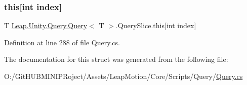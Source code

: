 \subsubsection{\texorpdfstring{this[int index]}{this[int index]}}
{\footnotesize\ttfamily T \mbox{\hyperlink{struct_leap_1_1_unity_1_1_query_1_1_query}{Leap.\+Unity.\+Query.\+Query}}$<$ T $>$.Query\+Slice.\+this\mbox{[}int index\mbox{]}\hspace{0.3cm}{\ttfamily [get]}}



Definition at line 288 of file Query.\+cs.



The documentation for this struct was generated from the following file\+:\begin{DoxyCompactItemize}
\item 
O\+:/\+Git\+H\+U\+B\+M\+I\+N\+I\+P\+Roject/\+Assets/\+Leap\+Motion/\+Core/\+Scripts/\+Query/\mbox{\hyperlink{_query_8cs}{Query.\+cs}}\end{DoxyCompactItemize}
